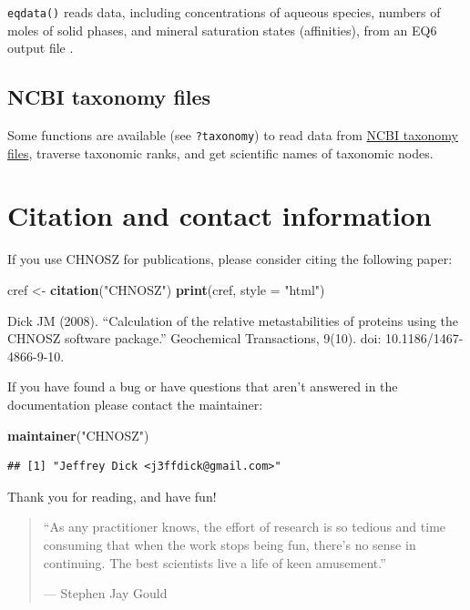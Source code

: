 \documentclass[]{tufte-book}
\newenvironment{Shaded}{}{}
\newcommand{\KeywordTok}[1]{\textcolor[rgb]{0.00,0.44,0.13}{\textbf{#1}}}
\newcommand{\DataTypeTok}[1]{\textcolor[rgb]{0.56,0.13,0.00}{#1}}
\newcommand{\StringTok}[1]{\textcolor[rgb]{0.25,0.44,0.63}{#1}}
\newcommand{\NormalTok}[1]{#1}
\begin{document}
{\texttt{eqdata()}} reads data, including concentrations of aqueous
species, numbers of moles of solid phases, and mineral saturation states
(affinities), from an EQ6 output file \citep{Wol92}.

\section{NCBI taxonomy files}\label{ncbi-taxonomy-files}

Some functions are available (see {\texttt{?taxonomy}}) to read data
from \href{ftp://ftp.ncbi.nih.gov/pub/taxonomy/}{NCBI taxonomy files},
traverse taxonomic ranks, and get scientific names of taxonomic nodes.

\chapter{Citation and contact
information}\label{citation-and-contact-information}

If you use CHNOSZ for publications, please consider citing the following
paper:

\begin{Shaded}
\begin{Highlighting}[]
\NormalTok{cref <-}\StringTok{ }\KeywordTok{citation}\NormalTok{(}\StringTok{"CHNOSZ"}\NormalTok{)}
\KeywordTok{print}\NormalTok{(cref, }\DataTypeTok{style =} \StringTok{"html"}\NormalTok{)}
\end{Highlighting}
\end{Shaded}

Dick JM (2008). ``Calculation of the relative metastabilities of
proteins using the CHNOSZ software package.'' Geochemical Transactions,
9(10). doi: 10.1186/1467-4866-9-10.

If you have found a bug or have questions that aren't answered in the
documentation please contact the maintainer:

\begin{Shaded}
\begin{Highlighting}[]
\KeywordTok{maintainer}\NormalTok{(}\StringTok{"CHNOSZ"}\NormalTok{)}
\end{Highlighting}
\end{Shaded}

\begin{verbatim}
## [1] "Jeffrey Dick <j3ffdick@gmail.com>"
\end{verbatim}

Thank you for reading, and have fun!

\begin{quote}
``As any practitioner knows, the effort of research is so tedious and
time consuming that when the work stops being fun, there's no sense in
continuing. The best scientists live a life of keen amusement.''

\hfill --- Stephen Jay Gould
\end{quote}
\end{document}
